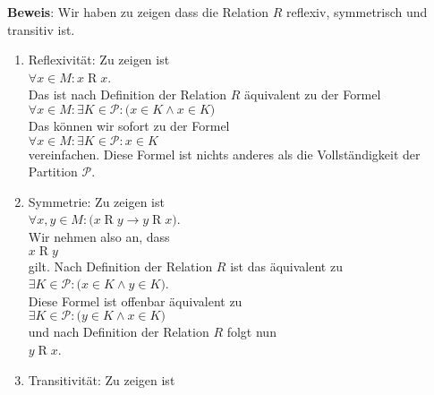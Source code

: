 \noindent
\textbf{Beweis}: Wir haben zu zeigen dass die Relation $R$ reflexiv, symmetrisch und
transitiv ist.
\begin{enumerate}
\item Reflexivität: Zu zeigen ist 
      \\[0.2cm]
      \hspace*{1.3cm}
      $\forall x \in M: x \mathop{R} x$.
      \\[0.2cm]
      Das ist nach Definition der Relation $R$ äquivalent zu der Formel 
      \\[0.2cm]
      \hspace*{1.3cm}
      $\forall x \in M: \exists K \in \mathcal{P}: \bigl(x \in K \wedge x \in K\bigr)$
      \\[0.2cm]
      Das können wir sofort zu der Formel
      \\[0.2cm]
      \hspace*{1.3cm}
      $\forall x \in M: \exists K \in \mathcal{P}: x \in K$
      \\[0.2cm]
      vereinfachen.  Diese Formel ist nichts anderes als die Vollständigkeit
      der Partition $\mathcal{P}$.
\item Symmetrie: Zu zeigen ist 
      \\[0.2cm]
      \hspace*{1.3cm}
      $\forall x, y \in M:\bigl( x \mathop{R} y \rightarrow y \mathop{R} x\bigr)$.
      \\[0.2cm]
      Wir nehmen also an, dass 
      \\[0.2cm]
      \hspace*{1.3cm}
      $x \mathop{R} y$ 
      \\[0.2cm]
      gilt.  Nach Definition
      der Relation $R$ ist das äquivalent zu 
      \\[0.2cm]
      \hspace*{1.3cm}
      $\exists K \in \mathcal{P}: \bigl(x \in K \wedge y \in K\bigr)$.
      \\[0.2cm]
      Diese Formel ist offenbar äquivalent zu 
      \\[0.2cm]
      \hspace*{1.3cm}
      $\exists K \in \mathcal{P}: \bigl(y \in K \wedge x \in K\bigr)$
      \\[0.2cm]
      und nach Definition der Relation $R$ folgt nun 
      \\[0.2cm]
      \hspace*{1.3cm}
      $y \mathop{R} x$.
\item Transitivität: Zu zeigen ist 

\end{enumerate}
